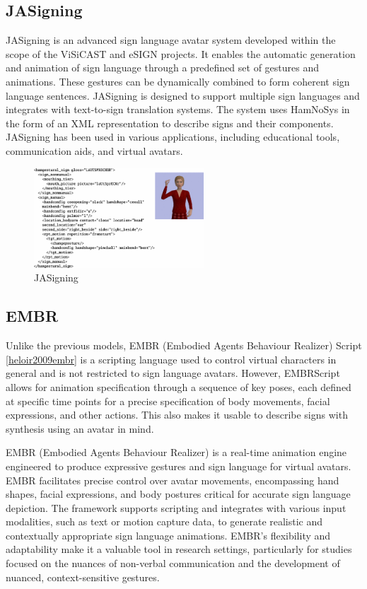 \documentclass[../../main.tex]{subfiles}
\begin{document}
\subsection{JASigning}

JASigning is an advanced sign language avatar system developed within the scope of the ViSiCAST and eSIGN projects\cite{elliott2010towards}. It enables the automatic generation and animation of sign language through a predefined set of gestures and animations. These gestures can be dynamically combined to form coherent sign language sentences. JASigning is designed to support multiple sign languages and integrates with text-to-sign translation systems. The system uses HamNoSys in the form of an XML representation\cite{elliott2004overview} to describe signs and their components. JASigning has been used in various applications, including educational tools, communication aids, and virtual avatars.

\begin{figure}
  \centering \includegraphics[width = 2.5in]{chapters/background_work/images/jasigning.png}
  \caption{JASigning}
  \label{fig:jasigning}
\end{figure}

\subsection{EMBR}

Unlike the previous models, EMBR (Embodied Agents Behaviour Realizer) Script \ref{heloir2009embr} is a scripting language used to control virtual characters in general and is not restricted to sign language avatars. However, EMBRScript allows for animation specification through a sequence of key poses, each defined at specific time points for a precise specification of body movements, facial expressions, and other actions. This also makes it usable to describe signs with synthesis using an avatar in mind.

EMBR (Embodied Agents Behaviour Realizer)\cite{heloir2010real} is a real-time animation engine engineered to produce expressive gestures and sign language for virtual avatars. EMBR facilitates precise control over avatar movements, encompassing hand shapes, facial expressions, and body postures critical for accurate sign language depiction. The framework supports scripting and integrates with various input modalities, such as text or motion capture data, to generate realistic and contextually appropriate sign language animations. EMBR's flexibility and adaptability make it a valuable tool in research settings, particularly for studies focused on the nuances of non-verbal communication and the development of nuanced, context-sensitive gestures.
\end{document}
